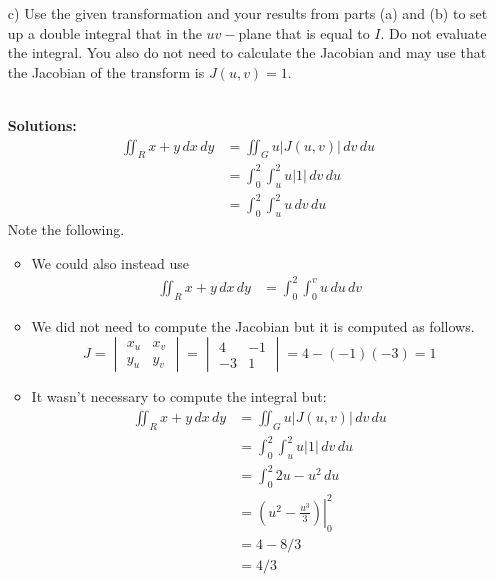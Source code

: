 \begin{enumerate}
        \item[c)] Use the given transformation and your results from parts (a) and (b) to set up a double integral that in the $uv-$plane that is equal to $I$. Do not evaluate the integral. You also do not need to calculate the Jacobian and may use that the Jacobian of the transform is $J(u,v) = 1$. 
            \ifnum {} {\color{DarkBlue} \\[12pt] 
            \textbf{Solutions:}
            \begin{align}
                \iint_{R} x+y \,dx\,dy
                &= \iint_{G} u \left| J(u,v) \right| \,dv\,du\\
                &= \int_0^2\int_{u}^{2} u \left| 1 \right| \,dv\,du\\
                &= \int_0^2\int_{u}^{2} u  \,dv\,du
            \end{align}
            Note the following.
            \begin{itemize}
                \item We could also instead use
                \begin{align}
                    \iint_{R} x+y \,dx\,dy &= \int_0^2\int_{0}^{v} u  \,du\,dv
                \end{align}
                \item We did not need to compute the Jacobian but it is computed as follows. 
                $$J 
                = \begin{vmatrix} x_u & x_v \\ y_u & y_v \end{vmatrix} 
                = \begin{vmatrix} 4 & -1 \\ -3 & 1\end{vmatrix} 
                = 4 - (-1)(-3)
                = 1$$
                \item It wasn't necessary to compute the integral but: 
                \begin{align}
                    \iint_{R} x+y \,dx\,dy
                    &= \iint_{G} u \left| J(u,v) \right| \,dv\,du\\
                    &= \int_0^2\int_{u}^{2} u \left| 1 \right| \,dv\,du\\
                    &= \int_0^2 2u - u^2 \,du\\
                    &= \left. \left( u^2 - \frac{u^3}{3} \right)\right|_0^2 \\
                    &= 4 - 8/3\\
                    &= 4/3
                \end{align}                
            \end{itemize}
            } 
            \else 
            \fi        
    \end{enumerate}
 
\fi 

